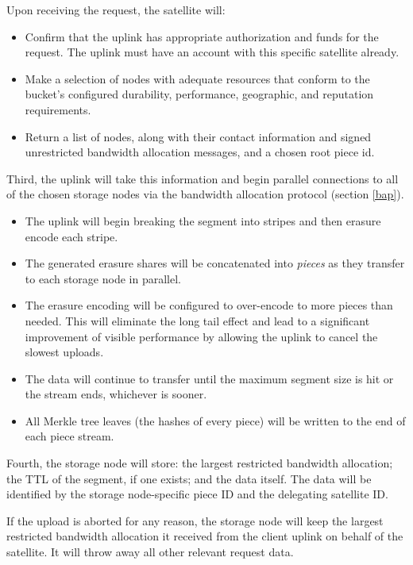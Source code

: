 \documentclass[11pt,fleqn,openany]{book}
\begin{document}
Upon receiving the request, the satellite will:
\begin{itemize}
\item Confirm that the uplink has appropriate authorization and funds for
  the request. The uplink must have an account with this specific satellite
  already.
\item Make a selection of nodes with adequate resources that conform to the
  bucket's configured durability, performance, geographic, and reputation
  requirements.
\item Return a list of nodes, along with their contact information and
  signed unrestricted bandwidth allocation messages, and a chosen root piece
  id.
\end{itemize}

Third, the uplink will take this information and begin parallel connections to
  all of the chosen storage nodes via the bandwidth allocation protocol
  (section \ref{bap}).

\begin{itemize}
\item The uplink will begin breaking the segment into stripes and then
  erasure encode each stripe.
\item The generated erasure shares will be concatenated into {\em pieces} as they
  transfer to each storage node in parallel.
\item The erasure encoding will be configured to over-encode to more pieces
  than needed. This will eliminate the long tail effect and lead to a
  significant improvement of visible performance by allowing the uplink to
  cancel the slowest uploads.
\item The data will continue to transfer until the maximum segment size is hit
  or the stream ends, whichever is sooner.
\item All Merkle tree leaves (the hashes of every piece) will be written to the
  end of each piece stream.
\end{itemize}

Fourth, the storage node will store: the largest restricted bandwidth allocation;
the TTL of the segment, if one exists; and the data itself. The data will
be identified by the storage node-specific piece ID and the delegating satellite
ID.

If the upload is aborted for any reason, the storage node will keep the
largest restricted bandwidth allocation it received from the client uplink on
behalf of the satellite. It will throw away all other relevant request data.
\end{document}

